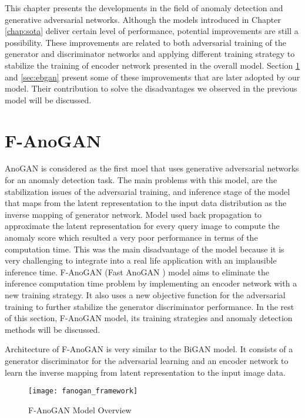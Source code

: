 
\begingroup

This chapter presents the developments in the field of anomaly detection and generative adversarial
networks. Although the models introduced in Chapter \ref{chap:sota} deliver certain level of
performance, potential improvements are still a possibility. These improvements are related to both
adversarial training of the generator and discriminator networks and applying different training strategy to 
stabilize the training of encoder network presented in the overall model. Section \ref{sec:fanogan} and 
\ref{sec:ebgan} present some of these improvements that are later adopted by our model. Their contribution
to solve the disadvantages we observed in the previous model will be discussed. 

\section{F-AnoGAN }
\label{sec:fanogan}

AnoGAN \cite{Schlegl2017UnsupervisedAD} is considered as the first moel that uses generative
adversarial networks for an anomaly detection task. The main problems with this model, are the
stabilization issues of the adversarial training, and inference stage of the model that
maps from the latent representation to the input data distribution
as the inverse mapping of generator network. Model used back propagation to approximate the latent
representation for every query image to compute the anomaly score which resulted a very poor
performance in terms of the computation time. This was the main disadvantage of the model
because it is very challenging to integrate into a real life application with an implausible
inference time. F-AnoGAN (Fast AnoGAN ) model \cite{pub.1111824956} aims to eliminate the inference computation time 
problem by implementing an encoder network with a new training strategy. It also uses a new objective function for the adversarial
training to further stabilize the generator discriminator performance. In the rest of this section,
F-AnoGAN model, its training strategies and anomaly detection methods will be discussed.

Architecture of F-AnoGAN is very similar to the BiGAN \cite{Donahue2017AdversarialFL}
model. It consists of a generator discriminator for the adversarial learning and an encoder
network to learn the inverse mapping from latent representation to the input image data.
\begin{figure}[h!]
	\centering
	\texttt{[image: fanogan\_framework]}
	\caption{F-AnoGAN Model Overview \cite{pub.1111824956}}
	\label{fig:fanogan_network}
\end{figure}

